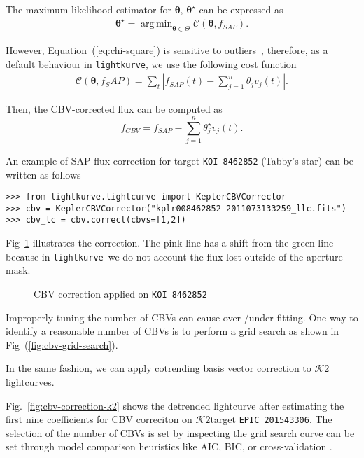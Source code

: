 \documentclass[twocolumn]{aastex62}
\newcommand{\KTWO}{$\mathcal{K}\mathit{2}$}
\newcommand{\lightkurve}{\texttt{lightkurve}}
\DeclareMathOperator*{\argmin}{arg\,min}
\begin{document}
The maximum likelihood estimator for $\bm{\theta}$, $\bm{\theta^{\star}}$ can be
expressed as
\begin{align}
    \bm{\theta}^{\star} = \argmin_{\bm{\theta} \in \Theta} \mathcal{C}(\bm{\theta}, f_{SAP}).
\end{align}

However, Equation~(\ref{eq:chi-square}) is sensitive to outliers~\cite{ivezi2014},
therefore, as a default behaviour in \lightkurve, we use the following cost
function
\begin{align}
    \mathcal{C}(\bm{\theta}, f_SAP) = \sum_{t} \left\rvert f_{SAP}(t)
    - \sum_{j=1}^{n}\theta_j v_{j}(t)\right\rvert.
\label{eq:l1-norm}
\end{align}


Then, the CBV-corrected flux can be computed as
\begin{equation}
    f_{CBV} = f_{SAP} - \sum_{j=1}^{n}\theta^{\star}_j v_{j}(t).
\end{equation}

An example of SAP flux correction for target \texttt{KOI 8462852}
(Tabby's star) can be written as follows
\begin{verbatim}
>>> from lightkurve.lightcurve import KeplerCBVCorrector
>>> cbv = KeplerCBVCorrector("kplr008462852-2011073133259_llc.fits")
>>> cbv_lc = cbv.correct(cbvs=[1,2])
\end{verbatim}

Fig~\ref{fig:cbv-correction} illustrates the correction. The pink line has a shift from
the green line because in \lightkurve~we do not account the flux lost outside of the aperture mask.

\begin{figure}[!htb]
    \centering
    \caption{CBV correction applied on \texttt{KOI 8462852}}
    \label{fig:cbv-correction}
\end{figure}


Improperly tuning the number of CBVs can cause over-/under-fitting. One
way to identify a reasonable number of CBVs is to perform a grid search
as shown in Fig~(\ref{fig:cbv-grid-search}).

In the same fashion, we can apply cotrending basis vector correction to
\KTWO lightcurves.

Fig.~\ref{fig:cbv-correction-k2} shows the detrended lightcurve after estimating
the first nine coefficients for CBV correciton on \KTWO target
 \texttt{EPIC 201543306}. The selection of the number of CBVs is set by inspecting the
grid search curve can be set through model comparison heuristics like AIC, BIC,
or cross-validation \cite{ivezi2014}.
\end{document}

